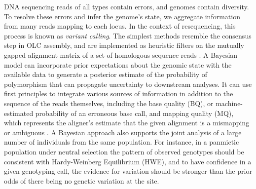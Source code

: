 DNA sequencing reads of all types contain errors, and genomes contain diversity.
To resolve these errors and infer the genome's state, we aggregate information from many reads mapping to each locus.
In the context of resequencing, this process is known as \emph{variant calling}.
The simplest methods resemble the consensus step in OLC assembly, and are implemented as heuristic filters on the mutually gapped alignment matrix of a set of homologous sequence reads \cite{koboldt2009varscan}.
A Bayesian model can incorporate prior expectations about the genomic state with the available data to generate a posterior estimate of the probability of polymorphism that can propagate uncertainty to downstream analyses.
It can use first principles to integrate various sources of information in addition to the sequence of the reads themselves, including the base quality (BQ), or machine-estimated probability of an erroneous base call, and mapping quality (MQ), which represents the aligner's estimate that the given alignment is a mismapping or ambiguous \cite{li2011statistical}.
A Bayesian approach also supports the joint analysis of a large number of individuals from the same population.
For instance, in a panmictic population under neutral selection the pattern of observed genotypes should be consistent with Hardy-Weinberg Equilibrium (HWE), and to have confidence in a given genotyping call, the evidence for variation should be stronger than the prior odds of there being no genetic variation at the site.

